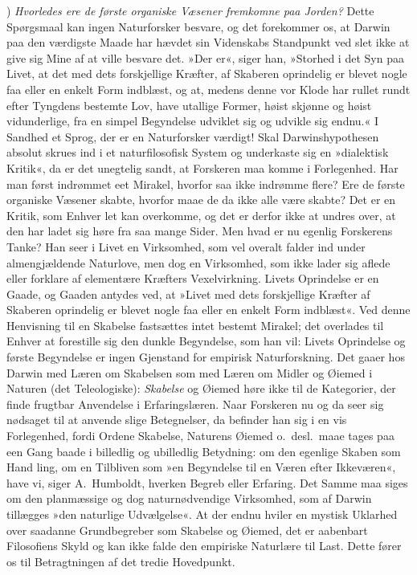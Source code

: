\documentclass[12pt,a4paper]{article}
\newcommand{\apage}[1]{\marginnote{\footnotesize\textit{[#1]}}}
\begin{document}

\medskip

) \emph{Hvorledes ere de første organiske Væsener fremkomne paa
Jorden?} Dette Spørgsmaal kan ingen Naturforsker besvare, og det
forekommer os, at Darwin paa den værdigste Maade har hævdet sin
Videnskabs Standpunkt ved slet ikke at give sig Mine af at ville
besvare det. »Der er«, siger han, »Storhed i det Syn paa Livet, at
det med dets forskjellige Kræfter, af Skaberen oprindelig er blevet
nogle faa eller en enkelt Form indblæst, og at, medens denne vor Klode
har rullet rundt efter Tyngdens bestemte Lov, have utallige Former,
høist skjønne og høist vidunderlige, fra en simpel \apage{455} Begyndelse udviklet
sig og udvikle sig endnu.«
I Sandhed et Sprog, der er en Naturforsker værdigt! Skal
Darwinshypothesen absolut skrues ind i et naturfilosofisk System og
underkaste sig en »dialektisk Kritik«, da er det unegtelig sandt, at
Forskeren maa komme i Forlegenhed. Har man først indrømmet eet Mirakel,
hvorfor saa ikke indrømme flere? Ere de første organiske Væsener
skabte, hvorfor maae de da ikke alle være skabte? Det er en Kritik,
som Enhver let kan overkomme, og det er derfor ikke at undres over, at
den har ladet sig høre fra saa mange Sider. Men hvad er nu egenlig
Forskerens Tanke? Han seer i Livet en Virksomhed, som vel overalt
falder ind under almengjældende Naturlove, men dog en Virksomhed, som
ikke lader sig aflede eller forklare af elementære Kræfters
Vexelvirkning. Livets Oprindelse er en Gaade, og Gaaden antydes ved,
at »Livet med dets forskjellige Kræfter af Skaberen oprindelig er
blevet nogle faa eller en enkelt Form indblæst«. Ved denne Henvisning
til en Skabelse fastsættes intet bestemt Mirakel; det overlades til
Enhver at forestille sig den dunkle Begyndelse, som han vil: Livets
Oprindelse og første Begyndelse er ingen Gjenstand for empirisk
Naturforskning.
Det gaaer hos Darwin med Læren om Skabelsen som med Læren om Midler og
Øiemed i Naturen (det Teleologiske): \emph{Skabelse} og Øiemed høre ikke til
de Kategorier, der finde frugtbar Anvendelse i Erfaringslæren. Naar
Forskeren nu og da seer sig nødsaget til at anvende slige Betegnelser,
da befinder han sig i en vis Forlegenhed, fordi Ordene Skabelse,
Naturens Øiemed o.\ desl.\ maae tages paa een Gang baade i billedlig
og ubilledlig Betydning: om den egenlige Skaben som \apage{456}Hand%
ling, om en Tilbliven som »en Begyndelse til en Væren efter Ikkeværen«,
have vi, siger A.\ Humboldt, hverken Begreb eller Erfaring. Det Samme
maa siges om den planmæssige og dog naturnødvendige Virksomhed, som
af Darwin tillægges »den naturlige Udvælgelse«. At der endnu hviler en
mystisk Uklarhed over saadanne Grundbegreber som Skabelse og Øiemed,
det er aabenbart Filosofiens Skyld og kan ikke falde den empiriske
Naturlære til Last. Dette fører os til Betragtningen af det tredie
Hovedpunkt.
\end{document}
